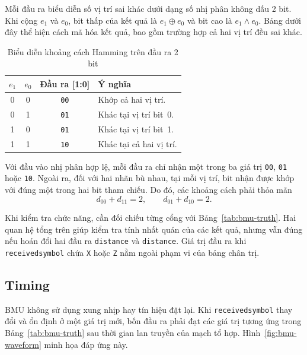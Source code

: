 \documentclass[12pt,a4paper]{article}
\renewcommand{\_}{\originalunderscore\allowbreak}
\begin{document}
Mỗi đầu ra biểu diễn số vị trí sai khác dưới dạng số nhị phân
không dấu 2 bit. Khi cộng $e_1$ và $e_0$, bit thấp của kết quả là
$e_1\oplus e_0$ và bit cao là $e_1\land e_0$. Bảng dưới đây thể hiện
cách mã hóa kết quả, bao gồm trường hợp cả hai vị trí đều sai khác.

\begin{table}[H]
    \centering
    \small
    \begin{tabular}{@{}c c c l@{}}
        \toprule
        $e_1$ & $e_0$ & \textbf{Đầu ra [1:0]} & \textbf{Ý nghĩa} \\
        \midrule
        0 & 0 & \texttt{00} & Khớp cả hai vị trí. \\
        0 & 1 & \texttt{01} & Khác tại vị trí bit~0. \\
        1 & 0 & \texttt{01} & Khác tại vị trí bit~1. \\
        1 & 1 & \texttt{10} & Khác tại cả hai vị trí. \\
        \bottomrule
    \end{tabular}
    \caption{Biểu diễn khoảng cách Hamming trên đầu ra 2 bit}
\end{table}

Với đầu vào nhị phân hợp lệ, mỗi đầu ra chỉ nhận một trong ba giá trị
\texttt{00}, \texttt{01} hoặc \texttt{10}. Ngoài ra, đối với hai nhãn
bù nhau, tại mỗi vị trí, bit nhận được khớp với đúng một trong hai bit
tham chiếu. Do đó, các khoảng cách phải thỏa mãn
\begin{equation}
    d_{00}+d_{11}=2,\qquad d_{01}+d_{10}=2.
\end{equation}

Khi kiểm tra chức năng, cần đối chiếu từng cổng với
Bảng~\ref{tab:bmu-truth}. Hai quan hệ tổng trên giúp kiểm tra tính
nhất quán của các kết quả, nhưng vẫn đúng nếu hoán đổi hai đầu ra
\texttt{distance\_01} và \texttt{distance\_10}. Giá trị đầu ra khi
\texttt{received\_symbol} chứa \texttt{X} hoặc \texttt{Z} nằm ngoài
phạm vi của bảng chân trị.

\subsection{Timing}

BMU không sử dụng xung nhịp hay tín hiệu đặt lại. Khi
\texttt{received\_symbol} thay đổi và ổn định ở một giá trị mới,
bốn đầu ra phải đạt các giá trị tương ứng trong
Bảng~\ref{tab:bmu-truth} sau thời gian lan truyền của mạch tổ hợp.
Hình~\ref{fig:bmu-waveform} minh họa đáp ứng này.
\end{document}
